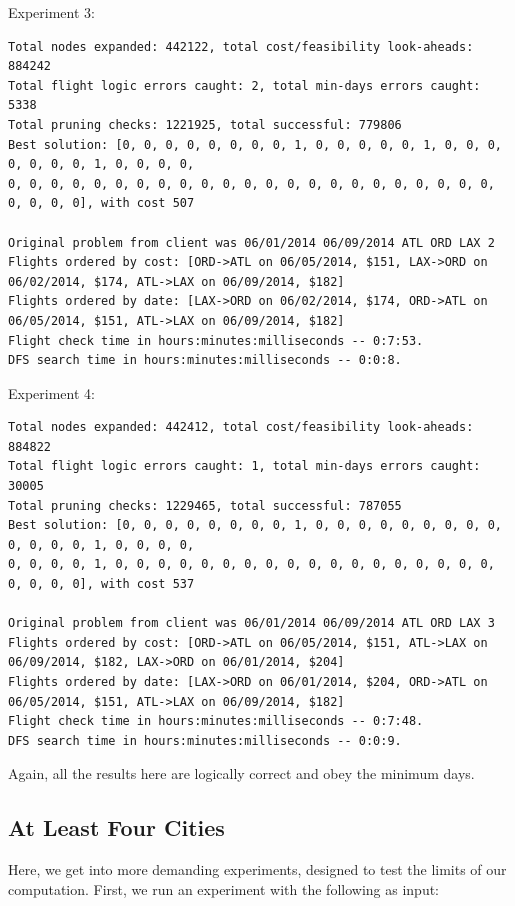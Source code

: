 \documentclass{article}
\begin{document}
Experiment 3:

\scriptsize
\begin{verbatim}
Total nodes expanded: 442122, total cost/feasibility look-aheads: 884242
Total flight logic errors caught: 2, total min-days errors caught: 5338
Total pruning checks: 1221925, total successful: 779806
Best solution: [0, 0, 0, 0, 0, 0, 0, 0, 1, 0, 0, 0, 0, 0, 1, 0, 0, 0, 0, 0, 0, 0, 1, 0, 0, 0, 0,
0, 0, 0, 0, 0, 0, 0, 0, 0, 0, 0, 0, 0, 0, 0, 0, 0, 0, 0, 0, 0, 0, 0, 0, 0, 0, 0], with cost 507

Original problem from client was 06/01/2014 06/09/2014 ATL ORD LAX 2
Flights ordered by cost: [ORD->ATL on 06/05/2014, $151, LAX->ORD on 06/02/2014, $174, ATL->LAX on 06/09/2014, $182]
Flights ordered by date: [LAX->ORD on 06/02/2014, $174, ORD->ATL on 06/05/2014, $151, ATL->LAX on 06/09/2014, $182]
Flight check time in hours:minutes:milliseconds -- 0:7:53.
DFS search time in hours:minutes:milliseconds -- 0:0:8.
\end{verbatim}
\normalsize

Experiment 4:

\scriptsize
\begin{verbatim}
Total nodes expanded: 442412, total cost/feasibility look-aheads: 884822
Total flight logic errors caught: 1, total min-days errors caught: 30005
Total pruning checks: 1229465, total successful: 787055
Best solution: [0, 0, 0, 0, 0, 0, 0, 0, 1, 0, 0, 0, 0, 0, 0, 0, 0, 0, 0, 0, 0, 0, 1, 0, 0, 0, 0,
0, 0, 0, 0, 1, 0, 0, 0, 0, 0, 0, 0, 0, 0, 0, 0, 0, 0, 0, 0, 0, 0, 0, 0, 0, 0, 0], with cost 537

Original problem from client was 06/01/2014 06/09/2014 ATL ORD LAX 3
Flights ordered by cost: [ORD->ATL on 06/05/2014, $151, ATL->LAX on 06/09/2014, $182, LAX->ORD on 06/01/2014, $204]
Flights ordered by date: [LAX->ORD on 06/01/2014, $204, ORD->ATL on 06/05/2014, $151, ATL->LAX on 06/09/2014, $182]
Flight check time in hours:minutes:milliseconds -- 0:7:48.
DFS search time in hours:minutes:milliseconds -- 0:0:9.
\end{verbatim}
\normalsize

Again, all the results here are logically correct and obey the minimum days.


\subsection{At Least Four Cities}\label{app:many-cities}

Here, we get into more demanding experiments, designed to test the limits of our computation. First, we run an experiment with the following as input:
\end{document}
